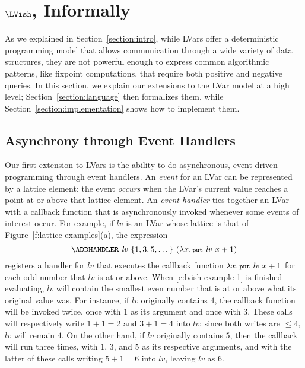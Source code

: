 \section{$\LVish$, Informally}\label{section:lvish-informal}

As we explained in Section~\ref{section:intro}, while LVars offer a deterministic
programming model that allows communication through a wide variety of data structures,
they are not powerful enough to express common algorithmic patterns, like fixpoint
computations, that require both positive and negative queries.  In this section,
we explain our extensions to the LVar model at a high level;
Section~\ref{section:language} then formalizes them, while
Section~\ref{section:implementation} shows how to implement them.

\subsection{Asynchrony through Event Handlers}

Our first extension to LVars is the ability to do asynchronous, event-driven
programming through event handlers.  An \emph{event} for an LVar can be
represented by a lattice element; the event \emph{occurs} when the LVar's
current value reaches a point at or above that lattice element.  An \emph{event handler} ties
together an LVar with a callback function that is asynchronously invoked
whenever some events of interest occur.  For example, if $\mathit{lv}$ is an LVar
whose lattice is that of Figure~\ref{f:lattice-examples}(a), the expression
\begin{equation}
  \ADDHANDLER~\mathit{lv}~\{ 1, 3, 5, \dots \}~(\lam{x}{\putexp{\mathit{lv}}{x+1}})
\label{e:lvish-example-1}
\end{equation}
registers a handler for $\mathit{lv}$ that executes the callback
function $\lambda x.\,\mbox{\footnotesize \texttt{put}}~\mathit{lv}~x+1$ for each odd number that
$\mathit{lv}$ is at or above.  When \ref{e:lvish-example-1} is
finished evaluating, $\mathit{lv}$ will contain the smallest even
number that is at or above what its original value was.  For instance,
if $\mathit{lv}$ originally contains $4$, the callback function will
be invoked twice, once with $1$ as its argument and once with $3$.
These calls will respectively write $1+1 = 2$ and $3+1 = 4$ into
$\mathit{lv}$; since both writes are $\leq 4$, $\mathit{lv}$ will
remain $4$.  On the other hand, if $\mathit{lv}$ originally contains
$5$, then the callback will run three times, with $1$, $3$, and $5$ as
its respective arguments, and with the latter of these calls writing
$5+1 = 6$ into $\mathit{lv}$, leaving $\mathit{lv}$ as $6$.

